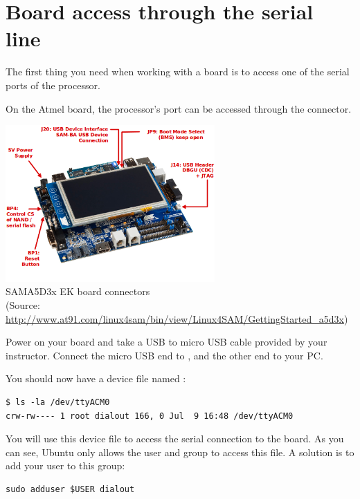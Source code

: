 
\section{Board access through the serial line}

The first thing you need when working with a board is to access one of
the serial ports of the processor.

On the Atmel board, the processor's  port can be accessed
through the  connector.

\begin{center}
\includegraphics[width=8cm]{labs/boottime-getting-started/a5d3x_board_presentation.png}
\\
SAMA5D3x EK board connectors \\
{\small
(Source:
\url{http://www.at91.com/linux4sam/bin/view/Linux4SAM/GettingStarted_a5d3x})}
\end{center}

Power on your board and take a USB to micro USB cable provided by your
instructor. Connect the micro USB end to , and the other end
to your PC.

You should now have a device file named :

\begin{verbatim}
$ ls -la /dev/ttyACM0
crw-rw---- 1 root dialout 166, 0 Jul  9 16:48 /dev/ttyACM0
\end{verbatim}

You will use this device file to access the serial connection to the board.
As you can see, Ubuntu only allows the  user and
 group to access this file. A solution is to add your user
to this  group:

\begin{verbatim}
sudo adduser $USER dialout
\end{verbatim}

